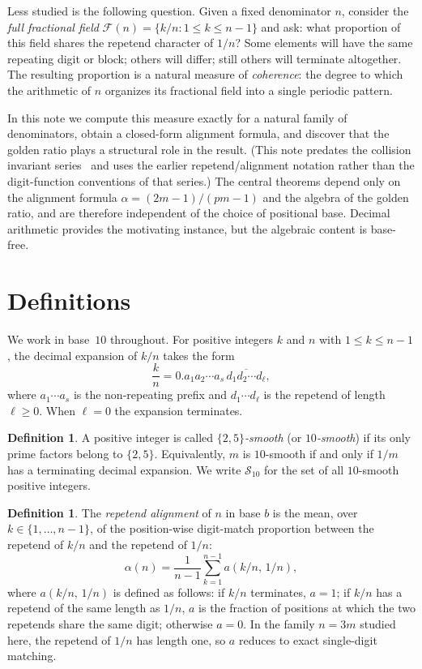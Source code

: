 \documentclass[12pt]{amsart}
\theoremstyle{definition}
\newtheorem{definition}[theorem]{Definition}
\theoremstyle{remark}
\begin{document}
Less studied is the following question. Given a fixed denominator $n$,
consider the \emph{full fractional field}
$\mathcal{F}(n) = \{k/n : 1 \le k \le n-1\}$ and ask: what proportion
of this field shares the repetend character of $1/n$? Some elements
will have the same repeating digit or block; others will differ; still
others will terminate altogether. The resulting proportion is a
natural measure of \emph{coherence}: the degree to which the
arithmetic of $n$ organizes its fractional field into a single periodic
pattern.

In this note we compute this measure exactly for a natural family of
denominators, obtain a closed-form alignment formula, and discover that
the golden ratio plays a structural role in the result. (This note
predates the collision invariant series~\cite{nfield} and uses the
earlier repetend/alignment notation rather than the digit-function
conventions of that series.)
The central theorems depend only on the alignment formula
$\alpha = (2m{-}1)/(pm{-}1)$ and the algebra of the golden ratio, and
are therefore independent of the choice of positional base. Decimal
arithmetic provides the motivating instance, but the algebraic content
is base-free.

\section{Definitions}

We work in base~$10$ throughout. For positive integers $k$ and $n$ with
$1 \le k \le n-1$, the decimal expansion of $k/n$ takes the form
\[
\frac{k}{n} = 0.a_{1}a_{2}\cdots a_{s}\,
\overline{d_{1}d_{2}\cdots d_{\ell}},
\]
where $a_{1}\cdots a_{s}$ is the non-repeating prefix and
$d_{1}\cdots d_{\ell}$ is the repetend of length $\ell \ge 0$. When
$\ell = 0$ the expansion terminates.

\begin{definition}
A positive integer is called \emph{$\{2,5\}$-smooth} (or
\emph{$10$-smooth}) if its only prime factors belong to $\{2,5\}$.
Equivalently, $m$ is $10$-smooth if and only if $1/m$ has a terminating
decimal expansion. We write $\mathcal{S}_{10}$ for the set of all
$10$-smooth positive integers.
\end{definition}

\begin{definition}
The \emph{repetend alignment} of $n$ in base $b$ is the mean,
over $k \in \{1, \ldots, n{-}1\}$, of the position-wise
digit-match proportion between the repetend of $k/n$ and the
repetend of $1/n$:
\[
\alpha(n) = \frac{1}{n-1}
\sum_{k=1}^{n-1} a(k/n,\, 1/n),
\]
where $a(k/n,\, 1/n)$ is defined as follows: if $k/n$
terminates, $a = 1$; if $k/n$ has a repetend of the same length
as $1/n$, $a$ is the fraction of positions at which the two
repetends share the same digit; otherwise $a = 0$. In the family
$n = 3m$ studied here, the repetend of $1/n$ has length one,
so $a$ reduces to exact single-digit matching.
\end{definition}
\end{document}
